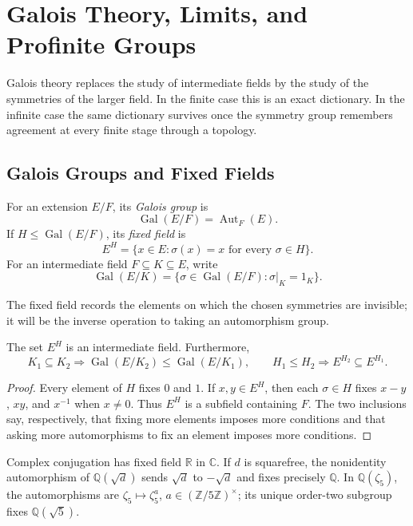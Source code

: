 \chapter[Galois Theory]{Galois Theory, Limits, and Profinite Groups}

Galois theory replaces the study of intermediate fields by the study of the
symmetries of the larger field.  In the finite case this is an exact
dictionary.  In the infinite case the same dictionary survives once the
symmetry group remembers agreement at every finite stage through a topology.

\section{Galois Groups and Fixed Fields}

\begin{definition}
For an extension \(E/F\), its \emph{Galois group} is
\[
\operatorname{Gal}(E/F)=\operatorname{Aut}_F(E).
\]
If \(H\leq\operatorname{Gal}(E/F)\), its \emph{fixed field} is
\[
E^H=\{x\in E:\sigma(x)=x\text{ for every }\sigma\in H\}.
\]
For an intermediate field \(F\subseteq K\subseteq E\), write
\[
\operatorname{Gal}(E/K)=\{\sigma\in\operatorname{Gal}(E/F):
\sigma|_K=1_K\}.
\]
\end{definition}

The fixed field records the elements on which the chosen symmetries are
invisible; it will be the inverse operation to taking an automorphism group.

\begin{lemma}\label{lem:fixed-field-intermediate}
The set \(E^H\) is an intermediate field.  Furthermore,
\[
K_1\subseteq K_2\Longrightarrow
\operatorname{Gal}(E/K_2)\leq\operatorname{Gal}(E/K_1),
\qquad
H_1\leq H_2\Longrightarrow E^{H_2}\subseteq E^{H_1}.
\]
\end{lemma}
\begin{proof}
Every element of \(H\) fixes \(0\) and \(1\).  If \(x,y\in E^H\), then each
\(\sigma\in H\) fixes \(x-y\), \(xy\), and \(x^{-1}\) when \(x\ne0\).
Thus \(E^H\) is a subfield containing \(F\).  The two inclusions say,
respectively, that fixing more elements imposes more conditions and that
asking more automorphisms to fix an element imposes more conditions.
\end{proof}

\begin{example}
Complex conjugation has fixed field \(\mathbb R\) in \(\mathbb C\).  If \(d\)
is squarefree, the nonidentity automorphism of \(\mathbb Q(\sqrt d)\) sends
\(\sqrt d\) to \(-\sqrt d\) and fixes precisely \(\mathbb Q\).  In
\(\mathbb Q(\zeta_5)\), the automorphisms are
\(\zeta_5\mapsto\zeta_5^a\), \(a\in(\mathbb Z/5\mathbb Z)^\times\); its
unique order-two subgroup fixes \(\mathbb Q(\sqrt5)\).
\end{example}

